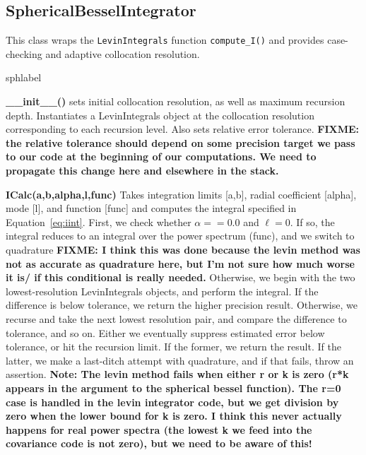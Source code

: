 \documentclass[10pt,a4paper]{article}
\begin{document}
\subsection{SphericalBesselIntegrator}
This class wraps the \verb|LevinIntegrals| function \verb|compute_I()| and provides case-checking and adaptive collocation resolution. 
\begin{labeling}{sphlabel}
	\item[\textbf{\_\_init\_\_()}] sets initial collocation resolution, as well as maximum recursion depth. Instantiates a LevinIntegrals object at the collocation resolution corresponding to each recursion level. Also sets relative error tolerance. \textbf{FIXME: the relative tolerance should depend on some precision target we pass to our code at the beginning of our computations. We need to propagate this change here and elsewhere in the stack.}
	
	\item[\textbf{ICalc(a,b,alpha,l,func)}] Takes integration limits [a,b], radial coefficient [alpha], mode [l], and function [func] and computes the integral specified in Equation~\eqref{eq:iint}. First, we check whether $\alpha==0.0$ and $\ell=0$. If so, the integral reduces to an integral over the power spectrum (func), and we switch to quadrature \textbf{FIXME: I think this was done because the levin method was not as accurate as quadrature here, but I'm not sure how much worse it is/ if this conditional is really needed.} Otherwise, we begin with the two lowest-resolution LevinIntegrals objects, and perform the integral. If the difference is below tolerance, we return the higher precision result. Otherwise, we recurse and take the next lowest resolution pair, and compare the difference to tolerance, and so on. Either we eventually suppress estimated error below tolerance, or hit the recursion limit. If the former, we return the result. If the latter, we make a last-ditch attempt with quadrature, and if that fails, throw an assertion.
	\textbf{Note: The levin method fails when either r or k is zero (r*k appears in the argument to the spherical bessel function). The r=0 case is handled in the levin integrator code, but we get division by zero when the lower bound for k is zero. I think this never actually happens for real power spectra (the lowest k we feed into the covariance code is not zero), but we need to be aware of this!}
	

\end{labeling}
\end{document}
